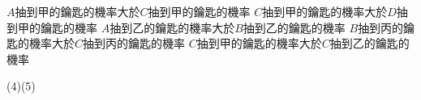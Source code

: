 \begin{QUESTIONS}
\begin{QUESTION}
\begin{QBODY}
\begin{QOPS}
				\QOP $A$抽到甲的鑰匙的機率大於$C$抽到甲的鑰匙的機率
				\QOP $C$抽到甲的鑰匙的機率大於$D$抽到甲的鑰匙的機率
				\QOP $A$抽到乙的鑰匙的機率大於$B$抽到乙的鑰匙的機率
				\QOP $B$抽到丙的鑰匙的機率大於$C$抽到丙的鑰匙的機率
				\QOP $C$抽到甲的鑰匙的機率大於$C$抽到乙的鑰匙的機率
			\end{QOPS}
        \end{QBODY}
        \begin{QFROMS}
        \end{QFROMS}
        \begin{QTAGS}\end{QTAGS}
        \begin{QANS}
            (4)(5)
        \end{QANS}
        \begin{QSOLLIST}
        \end{QSOLLIST}
        \begin{QEMPTYSPACE}
        \end{QEMPTYSPACE}
    \end{QUESTION}
\end{QUESTIONS}

